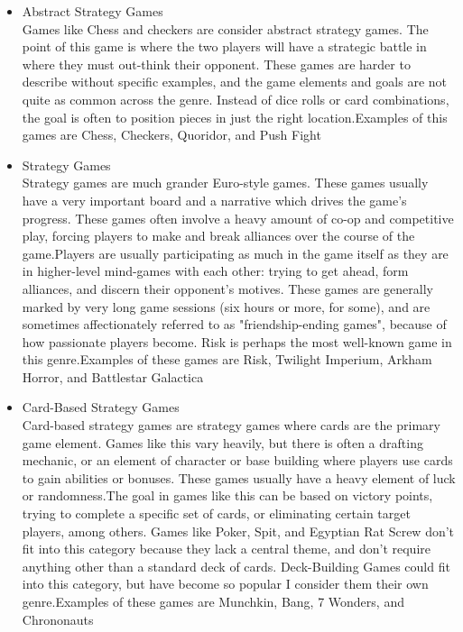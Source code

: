 \documentclass[12pt]{article}
\begin{document}
\begin{itemize}
\item Abstract Strategy Games
\\ Games like Chess and checkers are consider abstract strategy games. The point of this game is where the two players will have a strategic battle in where they must out-think their opponent. These games are harder to describe without specific examples, and the game elements and goals are not quite as common across the genre. Instead of dice rolls or card combinations, the goal is often to position pieces in just the right location.Examples of this games are Chess, Checkers, Quoridor, and Push Fight

\item Strategy Games
\\Strategy games are much grander Euro-style games. These games usually have a very important board and a narrative which drives the game's progress. These games often involve a heavy amount of co-op and competitive play, forcing players to make and break alliances over the course of the game.Players are usually participating as much in the game itself as they are in higher-level mind-games with each other: trying to get ahead, form alliances, and discern their opponent's motives. These games are generally marked by very long game sessions (six hours or more, for some), and are sometimes affectionately referred to as "friendship-ending games", because of how passionate players become. Risk is perhaps the most well-known game in this genre.Examples of these games are Risk, Twilight Imperium, Arkham Horror, and Battlestar Galactica

\item Card-Based Strategy Games
\\Card-based strategy games are strategy games where cards are the primary game element. Games like this vary heavily, but there is often a drafting mechanic, or an element of character or base building where players use cards to gain abilities or bonuses. These games usually have a heavy element of luck or randomness.The goal in games like this can be based on victory points, trying to complete a specific set of cards, or eliminating certain target players, among others. Games like Poker, Spit, and Egyptian Rat Screw don't fit into this category because they lack a central theme, and don't require anything other than a standard deck of cards. Deck-Building Games could fit into this category, but have become so popular I consider them their own genre.Examples of these games are Munchkin, Bang, 7 Wonders, and Chrononauts

\end{itemize}
\end{document}
